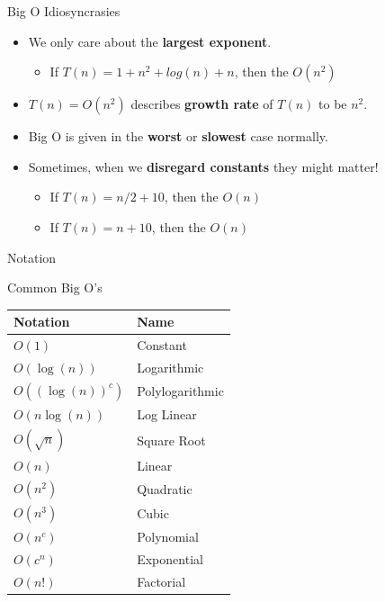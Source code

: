 \begin{frame}{Big O Idiosyncrasies}

\begin{itemize}
\tightlist
\item
  We only care about the \textbf{largest exponent}.

  \begin{itemize}
  \tightlist
  \item
    If \(T(n) = 1 + n^2 + log(n) + n\), then the \(O(n^2)\)
  \end{itemize}
\item
  \(T(n) = O(n^2)\) describes \textbf{growth rate} of \(T(n)\) to be
  \(n^2\).
\item
  Big O is given in the \textbf{worst} or \textbf{slowest} case
  normally.
\item
  Sometimes, when we \textbf{disregard constants} they might matter!

  \begin{itemize}
  \tightlist
  \item
    If \(T(n) = n/2 + 10\), then the \(O(n)\)
  \item
    If \(T(n) = n + 10\), then the \(O(n)\)
  \end{itemize}
\end{itemize}

\end{frame}

\begin{frame}{Notation}

Common Big O's

\begin{longtable}[c]{@{}ll@{}}
\toprule
\textbf{Notation} & \textbf{Name}\tabularnewline
\midrule
\endhead
\(O(1)\) & Constant\tabularnewline
\(O(\log (n))\) & Logarithmic\tabularnewline
\(O((\log (n))^c)\) & Polylogarithmic\tabularnewline
\(O({n\log (n)})\) & Log Linear\tabularnewline
\(O(\sqrt{n})\) & Square Root\tabularnewline
\(O(n)\) & Linear\tabularnewline
\(O(n^2)\) & Quadratic\tabularnewline
\(O(n^3)\) & Cubic\tabularnewline
\(O(n^c)\) & Polynomial\tabularnewline
\(O(c^n)\) & Exponential\tabularnewline
\(O(n!)\) & Factorial\tabularnewline
\bottomrule
\end{longtable}

\end{frame}

